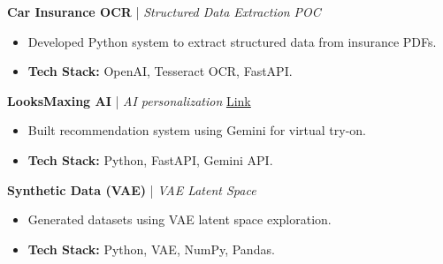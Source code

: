 \documentclass[10pt,a4paper]{article}
\newcommand{\resumeItem}[1]{\item\small{#1}}
\begin{document}
\begin{minipage}[t]{0.38\textwidth}
    \vspace{4pt}
    \textbf{Car Insurance OCR} | \small \textit{Structured Data Extraction} \hfill \small \textit{POC} \\
    \vspace{-6pt}
    \begin{itemize}[leftmargin=*, nosep]
        \resumeItem{Developed Python system to extract structured data from insurance PDFs.}
        \resumeItem{\textbf{Tech Stack:} OpenAI, Tesseract OCR, FastAPI.}
    \end{itemize}

    \vspace{4pt}
    \textbf{LooksMaxing AI} | \small \textit{AI personalization} \hfill \href{https://www.looksmaxxing.in/}{\small Link} \\
    \vspace{-6pt}
    \begin{itemize}[leftmargin=*, nosep]
        \resumeItem{Built recommendation system using Gemini for virtual try-on.}
        \resumeItem{\textbf{Tech Stack:} Python, FastAPI, Gemini API.}
    \end{itemize}

    \vspace{4pt}
    \textbf{Synthetic Data (VAE)} | \small \textit{VAE Latent Space} \\
    \vspace{-6pt}
    \begin{itemize}[leftmargin=*, nosep]
        \resumeItem{Generated datasets using VAE latent space exploration.}
        \resumeItem{\textbf{Tech Stack:} Python, VAE, NumPy, Pandas.}
    \end{itemize}

\end{minipage}
\hfill
\end{document}
